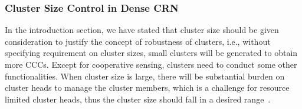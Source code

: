 \documentclass[10pt,journal,compsoc]{IEEEtran}
\theoremstyle{mytheoremstyle}
\theoremstyle{mytheoremstyle}
\theoremstyle{mytheoremstyle}
\newcommand{\ie}{i.e., }
\begin{document}
\subsubsection{Cluster Size Control in Dense CRN}
\label{cluster_pruning}

In the introduction section, we have stated that cluster size should be given consideration to justify the concept of robustness of clusters, \ie without specifying requirement on cluster sizes, small clusters will be generated to obtain more CCCs.
Except for cooperative sensing, clusters need to conduct some other functionalities.
When cluster size is large, there will be substantial burden on cluster heads to manage the cluster members, which is a challenge for resource limited cluster heads, thus the cluster size should fall in a desired range~\cite{Chen04clusteringalgorithms, capacity_cluster_06}.
\end{document}
